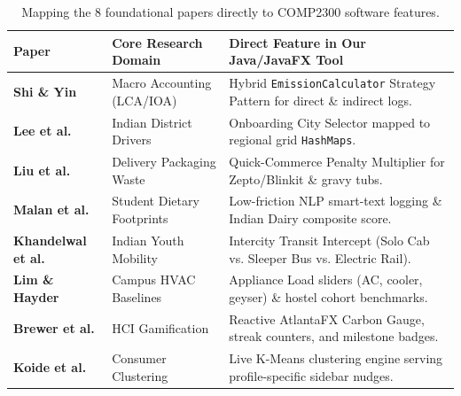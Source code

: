 \documentclass[12pt, a4paper]{article}
\begin{document}
\begin{table}[h!]
\centering
\small
\renewcommand{\arraystretch}{1.3}
\begin{tabularx}{\textwidth}{>{\bfseries}p{3.2cm} p{3.8cm} X}
\toprule
Paper & Core Research Domain & Direct Feature in Our Java/JavaFX Tool \\
\midrule
Shi \& Yin \cite{shi2021global} & Macro Accounting (LCA/IOA) & Hybrid \texttt{EmissionCalculator} Strategy Pattern for direct \& indirect logs. \\
Lee et al. \cite{lee2021india} & Indian District Drivers & Onboarding City Selector mapped to regional grid \texttt{HashMaps}. \\
Liu et al. \cite{liu2020packaging} & Delivery Packaging Waste & Quick-Commerce Penalty Multiplier for Zepto/Blinkit \& gravy tubs. \\
Malan et al. \cite{malan2020impact} & Student Dietary Footprints & Low-friction NLP smart-text logging \& Indian Dairy composite score. \\
Khandelwal et al. \cite{khandelwal2019students} & Indian Youth Mobility & Intercity Transit Intercept (Solo Cab vs. Sleeper Bus vs. Electric Rail). \\
Lim \& Hayder \cite{lim2019performance} & Campus HVAC Baselines & Appliance Load sliders (AC, cooler, geyser) \& hostel cohort benchmarks. \\
Brewer et al. \cite{brewer2015tough} & HCI Gamification & Reactive AtlantaFX Carbon Gauge, streak counters, and milestone badges. \\
Koide et al. \cite{koide2019carbon} & Consumer Clustering & Live K-Means clustering engine serving profile-specific sidebar nudges. \\
\bottomrule
\end{tabularx}
\caption{Mapping the 8 foundational papers directly to COMP2300 software features.}
\end{table}
\end{document}
